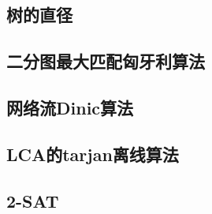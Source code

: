 \subsection{树的直径}


\subsection{二分图最大匹配匈牙利算法}



\subsection{网络流Dinic算法}


\subsection{LCA的tarjan离线算法}


\subsection{2-SAT}


